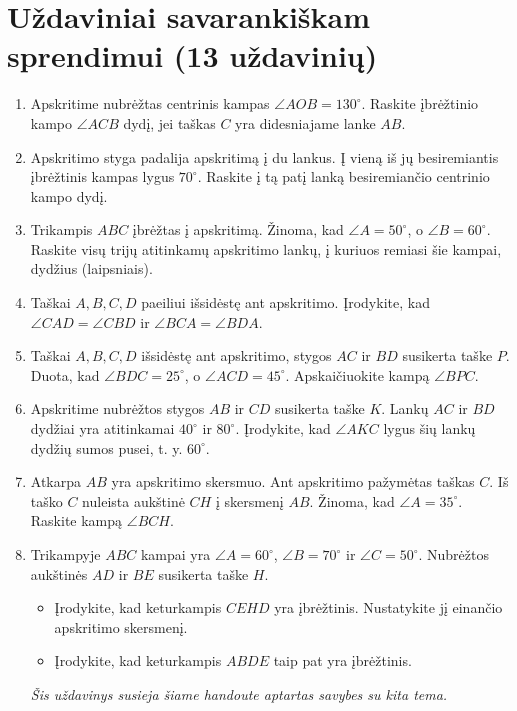 \documentclass[11pt,a4paper]{scrartcl}
\begin{document}
\section{Uždaviniai savarankiškam sprendimui (13 uždavinių)}
\begin{enumerate}
    \renewcommand{\labelenumi}{\textbf{\theenumi.}}
    
    \item Apskritime nubrėžtas centrinis kampas $\angle AOB=130^\circ$. Raskite įbrėžtinio kampo $\angle ACB$ dydį, jei taškas $C$ yra didesniajame lanke $AB$.
    \item Apskritimo styga padalija apskritimą į du lankus. Į vieną iš jų besiremiantis įbrėžtinis kampas lygus $70^\circ$. Raskite į tą patį lanką besiremiančio centrinio kampo dydį.
    \item Trikampis $ABC$ įbrėžtas į apskritimą. Žinoma, kad $\angle A = 50^\circ$, o $\angle B = 60^\circ$. Raskite visų trijų atitinkamų apskritimo lankų, į kuriuos remiasi šie kampai, dydžius (laipsniais).
    \item Taškai $A, B, C, D$ paeiliui išsidėstę ant apskritimo. Įrodykite, kad $\angle CAD=\angle CBD$ ir $\angle BCA=\angle BDA$.
    \item Taškai $A, B, C, D$ išsidėstę ant apskritimo, stygos $AC$ ir $BD$ susikerta taške $P$. Duota, kad $\angle BDC = 25^\circ$, o $\angle ACD = 45^\circ$. Apskaičiuokite kampą $\angle BPC$.
    \item Apskritime nubrėžtos stygos $AB$ ir $CD$ susikerta taške $K$. Lankų $AC$ ir $BD$ dydžiai yra atitinkamai $40^\circ$ ir $80^\circ$. Įrodykite, kad $\angle AKC$ lygus šių lankų dydžių sumos pusei, t. y. $60^\circ$.
    \item Atkarpa $AB$ yra apskritimo skersmuo. Ant apskritimo pažymėtas taškas $C$. Iš taško $C$ nuleista aukštinė $CH$ į skersmenį $AB$. Žinoma, kad $\angle A = 35^\circ$. Raskite kampą $\angle BCH$.
    \item Trikampyje $ABC$ kampai yra $\angle A=60^\circ$, $\angle B=70^\circ$ ir $\angle C=50^\circ$. Nubrėžtos aukštinės $AD$ ir $BE$ susikerta taške $H$.
    \begin{itemize}
        \item[a)] Įrodykite, kad keturkampis $CEHD$ yra įbrėžtinis. Nustatykite jį einančio apskritimo skersmenį.
        \item[b)] Įrodykite, kad keturkampis $ABDE$ taip pat yra įbrėžtinis.
    \end{itemize}
    \textit{Šis uždavinys susieja šiame handoute aptartas savybes su kita tema.}

\end{enumerate}
\end{document}
